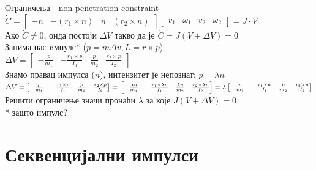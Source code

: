 \documentclass[]{beamer}
\begin{document}
\begin{frame}{Ограничења - non-penetration constraint}
    $\dot{C} = \begin{bmatrix} -n & -(r_1 \times n) & n & (r_2 \times n)\end{bmatrix}
        \begin{bmatrix} v_1 & \omega_1 & v_2 & \omega_2 \end{bmatrix}
    = J \cdot V $ \\
    
    Ако $\dot{C} \neq 0$, онда постоји $\Delta V$ такво да је $\dot{C} = J(V+\Delta V) = 0$ \\
    Занима нас импулс* ($p = m \Delta v, L = r \times p$)\\
    $\Delta V = 
    \begin{bmatrix}
        -\frac{p}{m_1} & -\frac{r_1 \times p}{I_1} & \frac{p}{m_2} & \frac{r_2 \times p}{I_2}
    \end{bmatrix}$ \\
    Знамо правац импулса ($n$), интензитет је непознат: $p = \lambda n$ \\
    $
    \Delta V = 
    \begin{bmatrix}
        -\frac{p}{m_1} & -\frac{r_1 \times p}{I_1} & \frac{p}{m_2} & \frac{r_2 \times p}{I_2}
    \end{bmatrix}
    = \\
    \begin{bmatrix}
        -\frac{\lambda n}{m_1} & -\frac{r_1 \times \lambda n}{I_1} & \frac{\lambda n}{m_2} & \frac{r_2 \times \lambda n}{I_2}
    \end{bmatrix}
    = \\
    \lambda \begin{bmatrix} -\frac{n}{m_1} & -\frac{r_1 \times n}{I_1} & \frac{n}{m_2} & \frac{r_2 \times n}{I_2}\end{bmatrix} 
    $ \\ 
    Решити ограничење значи пронаћи $\lambda$ за које $J(V + \Delta V) = 0$ \\
    * зашто импулс?
\end{frame}


\section{Секвенцијални импулси}
\end{document}
